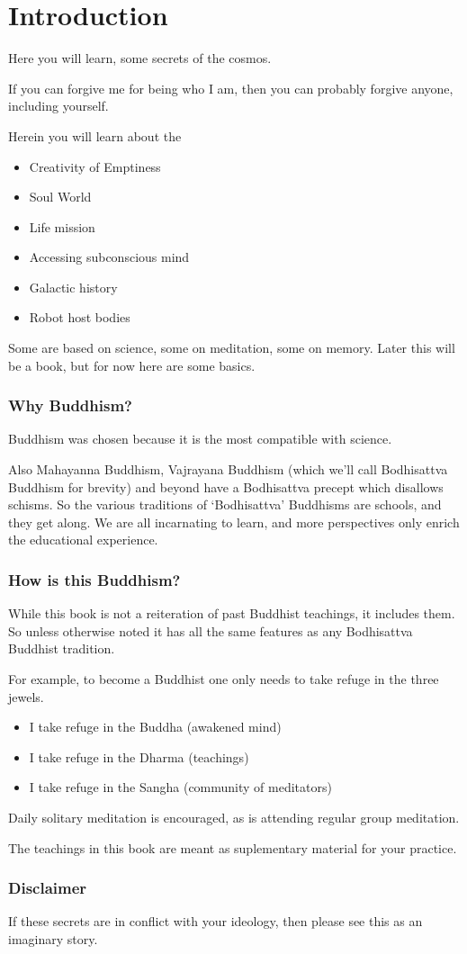 \documentclass{report}
\begin{document}
\chapter{Introduction}
Here you will learn, some secrets of the cosmos.

If  you can forgive me for being who I am, then you can probably forgive anyone,
including yourself. 

Herein you will learn about the
\begin{itemize}
  \item Creativity of Emptiness
  \item Soul World
  \item Life mission
  \item Accessing subconscious mind
  \item Galactic history
  \item Robot host bodies
\end{itemize}

Some are based on science, some on meditation, some on memory. 
Later this will be a book, but for now here are some basics. 

\subsection{Why Buddhism?}
Buddhism was chosen because it is the most compatible with science.

Also Mahayanna Buddhism, Vajrayana Buddhism (which we'll call Bodhisattva
Buddhism for brevity) and beyond have a Bodhisattva 
precept which disallows schisms.  So the various traditions of `Bodhisattva'
Buddhisms are schools, 
and they get along. We are all incarnating to learn, and more perspectives only
enrich the educational experience.

\subsection{How is this Buddhism?}

While this book is not a reiteration of past Buddhist teachings, it includes
them. So unless otherwise noted it has all the same features as any Bodhisattva
Buddhist tradition.  

For example, to become a Buddhist one only needs to take refuge in the three
jewels.  

\begin{itemize}
  \item I take refuge in the Buddha (awakened mind)
  \item I take refuge in the Dharma (teachings)
  \item I take refuge in the Sangha (community of meditators)
\end{itemize}

Daily solitary meditation is encouraged, as is attending regular group
meditation.

The teachings in this book are meant as suplementary material for your
practice. 

\subsection{Disclaimer} 
If these secrets are in conflict with your ideology,
then please see this as an imaginary story. 
\end{document}
